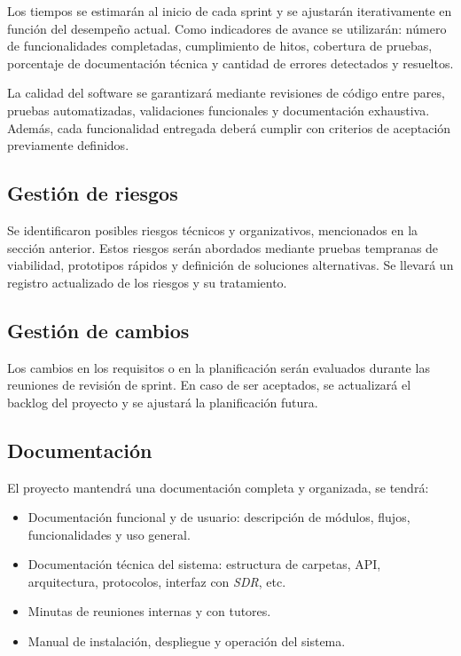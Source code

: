 Los tiempos se estimarán al inicio de cada sprint y se ajustarán iterativamente en función del desempeño actual. Como indicadores de avance se utilizarán: número de funcionalidades completadas, cumplimiento de hitos, cobertura de pruebas, porcentaje de documentación técnica y cantidad de errores detectados y resueltos.

La calidad del software se garantizará mediante revisiones de código entre pares, pruebas automatizadas, validaciones funcionales y documentación exhaustiva. Además, cada funcionalidad entregada deberá cumplir con criterios de aceptación previamente definidos.

\subsection*{Gestión de riesgos}

Se identificaron posibles riesgos técnicos y organizativos, mencionados en la sección anterior. Estos riesgos serán abordados mediante pruebas tempranas de viabilidad, prototipos rápidos y definición de soluciones alternativas. Se llevará un registro actualizado de los riesgos y su tratamiento.

\subsection*{Gestión de cambios}

Los cambios en los requisitos o en la planificación serán evaluados durante las reuniones de revisión de sprint. En caso de ser aceptados, se actualizará el backlog del proyecto y se ajustará la planificación futura.

\subsection*{Documentación}

El proyecto mantendrá una documentación completa y organizada, se tendrá:

\begin{itemize}
    \item Documentación funcional y de usuario: descripción de módulos, flujos, funcionalidades y uso general.
    \item Documentación técnica del sistema: estructura de carpetas, API, arquitectura, protocolos, interfaz con \textit{SDR}, etc.
    \item Minutas de reuniones internas y con tutores.
    \item Manual de instalación, despliegue y operación del sistema.
\end{itemize}

